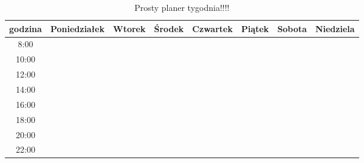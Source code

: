 \begin{table}[h]
\centering
\begin{tabular}{|c|c|c|c|c|c|c|c|}
\hline
godzina & \textbf{Poniedziałek} & \textbf{Wtorek} & \textbf{Środek} & \textbf{Czwartek} & \textbf{Piątek} & \textbf{Sobota} & \textbf{Niedziela} \\ \hline
8:00    &                       &                 &                 &                   &                 &                 &                    \\ \hline
10:00   &                       &                 &                 &                   &                 &                 &                    \\ \hline
12:00   &                       &                 &                 &                   &                 &                 &                    \\ \hline
14:00   &                       &                 &                 &                   &                 &                 &                    \\ \hline
16:00   &                       &                 &                 &                   &                 &                 &                    \\ \hline
18:00   &                       &                 &                 &                   &                 &                 &                    \\ \hline
20:00   &                       &                 &                 &                   &                 &                 &                    \\ \hline
22:00   &                       &                 &                 &                   &                 &                 &                    \\ \hline
\end{tabular}
\caption{Prosty planer tygodnia!!!!}
\end{table}
